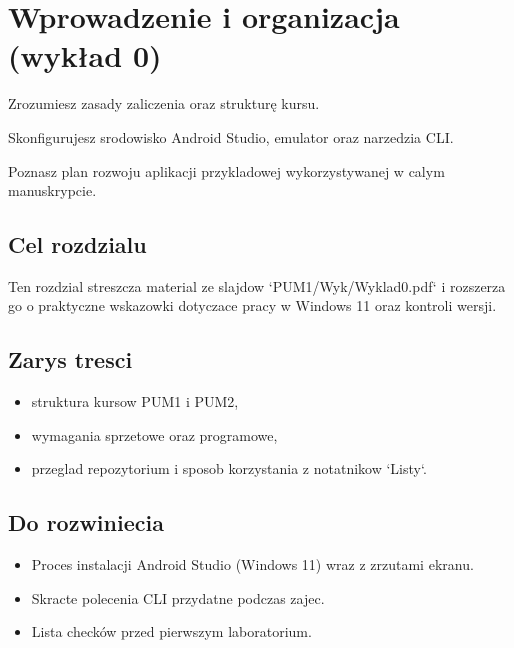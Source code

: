 \chapter{Wprowadzenie i organizacja (wykład 0)}

\begin{learningobjectives}
  \item Zrozumiesz zasady zaliczenia oraz struktur\k e kursu.
  \item Skonfigurujesz srodowisko Android Studio, emulator oraz narzedzia CLI.
  \item Poznasz plan rozwoju aplikacji przykladowej wykorzystywanej w calym manuskrypcie.
\end{learningobjectives}

\section{Cel rozdzialu}
Ten rozdzial streszcza material ze slajdow `PUM1/Wyk/Wyklad0.pdf` i rozszerza go o praktyczne wskazowki dotyczace pracy w Windows 11 oraz kontroli wersji.

\section{Zarys tresci}
\begin{itemize}
  \item struktura kursow PUM1 i PUM2,
  \item wymagania sprzetowe oraz programowe,
  \item przeglad repozytorium i sposob korzystania z notatnikow `Listy`.
\end{itemize}

\section{Do rozwiniecia}
\begin{itemize}
  \item Proces instalacji Android Studio (Windows 11) wraz z zrzutami ekranu.
  \item Skracte polecenia CLI przydatne podczas zajec.
  \item Lista checków przed pierwszym laboratorium.
\end{itemize}

